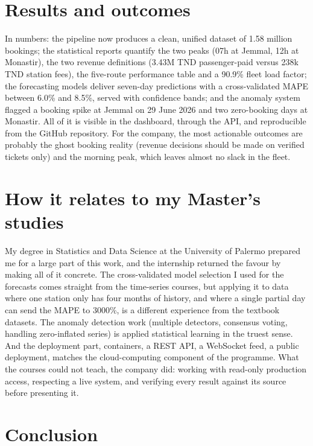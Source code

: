 \documentclass[11pt,a4paper]{article}
\begin{document}
\section{Results and outcomes}

In numbers: the pipeline now produces a clean, unified dataset of 1.58 million
bookings; the statistical reports quantify the two peaks (07h at Jemmal, 12h at
Monastir), the two revenue definitions (3.43M TND passenger-paid versus 238k TND
station fees), the five-route performance table and a 90.9\% fleet load factor; the
forecasting models deliver seven-day predictions with a cross-validated MAPE between
6.0\% and 8.5\%, served with confidence bands; and the anomaly system flagged a
booking spike at Jemmal on 29 June 2026 and two zero-booking days at Monastir. All of
it is visible in the dashboard, through the API, and reproducible from the GitHub
repository. For the company, the most actionable outcomes are probably the ghost
booking reality (revenue decisions should be made on verified tickets only) and the
morning peak, which leaves almost no slack in the fleet.

\section{How it relates to my Master's studies}

My degree in Statistics and Data Science at the University of Palermo prepared me for
a large part of this work, and the internship returned the favour by making all of it
concrete. The cross-validated model selection I used for the forecasts comes straight
from the time-series courses, but applying it to data where one station only has
four months of history, and where a single partial day can send the MAPE to 3000\%,
is a different experience from the textbook datasets. The anomaly detection work
(multiple detectors, consensus voting, handling zero-inflated series) is applied
statistical learning in the truest sense. And the deployment part, containers, a
REST API, a WebSocket feed, a public deployment, matches the cloud-computing
component of the programme. What the courses could not teach, the company did:
working with read-only production access, respecting a live system, and verifying
every result against its source before presenting it.

\section{Conclusion}
\end{document}
